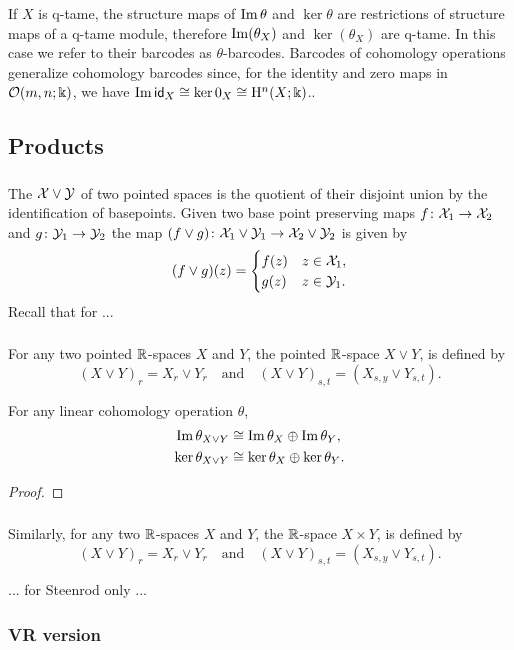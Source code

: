If $X$ is q-tame, the structure maps of $\operatorname{Im}\theta$ and $\ker\theta$ are restrictions of structure maps of a q-tame module, therefore $\operatorname{Im}(\theta_X)$ and $\ker(\theta_X)$ are q-tame.
In this case we refer to their barcodes as $\theta$-barcodes.
Barcodes of cohomology operations generalize cohomology barcodes since, for the identity and zero maps in $\mathcal{O}(m,n;\Bbbk)$, we have $\operatorname{Im}\mathsf{id}_X \cong \ker0_X \cong \mathrm{H}^n(X;\Bbbk)$..



\subsection{Products}

\subsubsection{}
The  $\mathcal{X} \vee \mathcal{Y}$ of two pointed spaces is the quotient of their disjoint union by the identification of basepoints.
Given two base point preserving maps $f \colon \mathcal{X}_1 \to \mathcal{X}_2$ and $g \colon \mathcal{Y}_1 \to \mathcal{Y}_2$ the map $(f \vee g) \colon \mathcal{X}_1 \vee \mathcal{Y}_1 \to \mathcal{X}_2 \vee \mathcal{Y}_2$ is given by
\[
(f \vee g)(z) =
\begin{cases}
	f(z) & z \in \mathcal{X}_1, \\
	g(z) & z \in \mathcal{Y}_1.\\
\end{cases}
\]
Recall that for ...

\subsubsection{}
For any two pointed $\mathbb{R}$-spaces $X$ and $Y$, the pointed $\mathbb{R}$-space $X \vee Y$, is defined by
\[
(X \vee Y)_r = X_r \vee Y_r \quad\text{and}\quad (X \vee Y)_{s,t} = (X_{s,y} \vee Y_{s,t}).
\]

\medskip\theorem For any linear cohomology operation $\theta$,
\begin{align*}
	\operatorname{Im}\theta_{X \vee Y} &\cong \operatorname{Im}\theta_X \oplus \operatorname{Im}\theta_Y, \\
	\ker\theta_{X \vee Y} &\cong \ker\theta_X \oplus \ker\theta_Y.
\end{align*}

\begin{proof}
\end{proof}

\subsubsection{}

Similarly, for any two $\mathbb{R}$-spaces $X$ and $Y$, the $\mathbb{R}$-space $X \times Y$, is defined by
\[
(X \vee Y)_r = X_r \vee Y_r \quad\text{and}\quad (X \vee Y)_{s,t} = (X_{s,y} \vee Y_{s,t}).
\]

... for Steenrod only ...

\subsubsection{VR version}